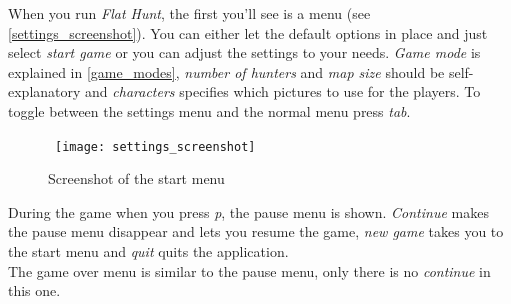 When you run \emph{Flat Hunt}, the first you'll see is a menu (see \autoref{settings_screenshot}). You can either let the default options in place and just select \emph{start game} or you can adjust the settings to your needs. \emph{Game mode} is explained in \autoref{game_modes}, \emph{number of hunters} and \emph{map size} should be self-explanatory and \emph{characters} specifies which pictures to use for the players. To toggle between the settings menu and the normal menu press \emph{tab}.\\
\begin{figure}[h]
  \centerline{\hbox{
    \texttt{[image: settings\_screenshot]}
  }}
\caption{Screenshot of the start menu}
\label{settings_screenshot}
\end{figure}

  During the game when you press \emph{p}, the pause menu is shown. \emph{Continue} makes the pause menu disappear and lets you resume the game, \emph{new game} takes you to the start menu and \emph{quit} quits the application.\\

  The game over menu is similar to the pause menu, only there is no \emph{continue} in this one.
